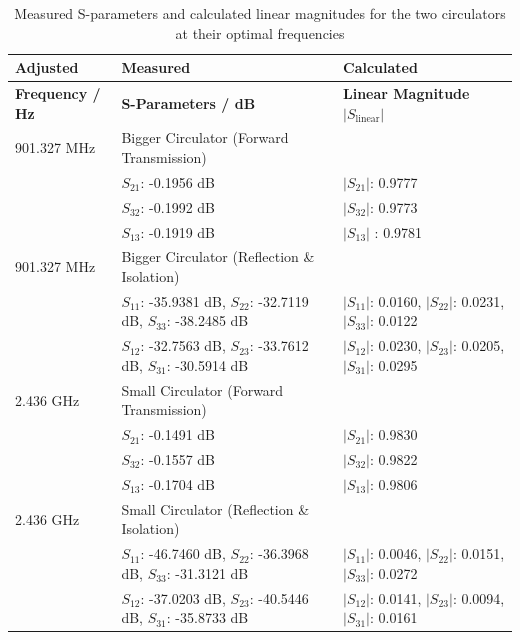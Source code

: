 \begin{table}[htpb]
    \centering
    \label{tab:circulator_results}
    \begin{tabular}{|l|l|l|}
        \hline
        \textbf{Adjusted} & \textbf{Measured} & \textbf{Calculated} \\
        \hline
        \textbf{Frequency / Hz} & \textbf{S-Parameters / dB} & \textbf{Linear Magnitude $|S_{\text{linear}}|$} \\
        \hline
        901.327 MHz & Bigger Circulator (Forward Transmission) & \\
                    & $S_{21}$: -0.1956 dB & $|S_{21}|$: 0.9777 \\
                    & $S_{32}$: -0.1992 dB & $|S_{32}|$: 0.9773 \\
                    & $S_{13}$: -0.1919 dB & $|S_{13}|$ : 0.9781 \\
        \hline
        901.327 MHz & Bigger Circulator (Reflection \& Isolation) & \\
                    & $S_{11}$: -35.9381 dB, $S_{22}$: -32.7119 dB, $S_{33}$: -38.2485 dB & $|S_{11}|$: 0.0160, $|S_{22}|$: 0.0231, $|S_{33}|$: 0.0122 \\
                    & $S_{12}$: -32.7563 dB, $S_{23}$: -33.7612 dB, $S_{31}$: -30.5914 dB & $|S_{12}|$: 0.0230, $|S_{23}|$: 0.0205, $|S_{31}|$: 0.0295 \\
        \hline
        2.436 GHz   & Small Circulator (Forward Transmission) & \\
                    & $S_{21}$: -0.1491 dB & $|S_{21}|$: 0.9830 \\
                    & $S_{32}$: -0.1557 dB & $|S_{32}|$: 0.9822 \\
                    & $S_{13}$: -0.1704 dB & $|S_{13}|$: 0.9806 \\
        \hline
        2.436 GHz   & Small Circulator (Reflection \& Isolation) & \\
                    & $S_{11}$: -46.7460 dB, $S_{22}$: -36.3968 dB, $S_{33}$: -31.3121 dB & $|S_{11}|$: 0.0046, $|S_{22}|$: 0.0151, $|S_{33}|$: 0.0272 \\
                    & $S_{12}$: -37.0203 dB, $S_{23}$: -40.5446 dB, $S_{31}$: -35.8733 dB & $|S_{12}|$: 0.0141, $|S_{23}|$: 0.0094, $|S_{31}|$: 0.0161 \\
        \hline
    \end{tabular}
    \caption{Measured S-parameters and calculated linear magnitudes for the two circulators at their optimal frequencies}
\end{table}

